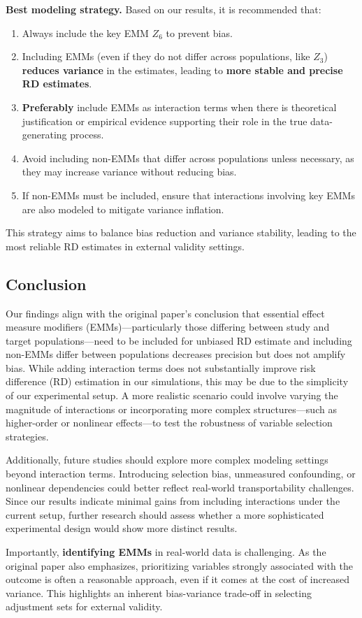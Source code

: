 \documentclass[12pt,oneside]{amsart}
\theoremstyle{definition}
\theoremstyle{remark}
\numberwithin{equation}{section}
\begin{document}
\textbf{Best modeling strategy.} Based on our results, it is recommended that:

\begin{enumerate}
    \item Always include the key EMM $Z_6$ to prevent bias.
    \item Including EMMs (even if they do not differ across populations, like $Z_3$) \textbf{reduces variance} in the estimates, leading to \textbf{more stable and precise RD estimates}.
    \item \textbf{Preferably} include EMMs as interaction terms when there is theoretical justification or empirical evidence supporting their role in the true data-generating process.
    \item Avoid including non-EMMs that differ across populations unless necessary, as they may increase variance without reducing bias.
    \item If non-EMMs must be included, ensure that interactions involving key EMMs are also modeled to mitigate variance inflation.
\end{enumerate}
This strategy aims to balance bias reduction and variance stability, leading to the most reliable RD estimates in external validity settings.


\subsection{Conclusion}  
Our findings align with the original paper’s conclusion that essential effect measure modifiers (EMMs)—particularly those differing between study and target populations—need to be included for unbiased RD estimate and including non-EMMs differ between populations decreases precision but does not amplify bias. While adding interaction terms does not substantially improve risk difference (RD) estimation in our simulations, this may be due to the simplicity of our experimental setup. A more realistic scenario could involve varying the magnitude of interactions or incorporating more complex structures—such as higher-order or nonlinear effects—to test the robustness of variable selection strategies. 

Additionally, future studies should explore more complex modeling settings beyond interaction terms. Introducing selection bias, unmeasured confounding, or nonlinear dependencies could better reflect real-world transportability challenges. Since our results indicate minimal gains from including interactions under the current setup, further research should assess whether a more sophisticated experimental design would show more distinct results.

Importantly, \textbf{identifying EMMs} in real-world data is challenging. As the original paper also emphasizes, prioritizing variables strongly associated with the outcome is often a reasonable approach, even if it comes at the cost of increased variance. This highlights an inherent bias-variance trade-off in selecting adjustment sets for external validity. 




\clearpage
\printbibliography
\end{document}
